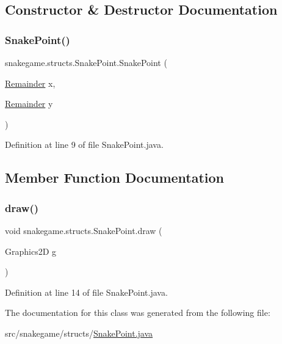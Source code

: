 \subsection{Constructor \& Destructor Documentation}
\mbox{\label{classsnakegame_1_1structs_1_1_snake_point_ae366301b429df98a08689c778a097d7c}} 
\subsubsection{\texorpdfstring{Snake\+Point()}{SnakePoint()}}
{\footnotesize\ttfamily snakegame.\+structs.\+Snake\+Point.\+Snake\+Point (\begin{DoxyParamCaption}\item[{\mbox{\hyperlink{classsnakegame_1_1structs_1_1_remainder}{Remainder}}}]{x,  }\item[{\mbox{\hyperlink{classsnakegame_1_1structs_1_1_remainder}{Remainder}}}]{y }\end{DoxyParamCaption})}



Definition at line 9 of file Snake\+Point.\+java.



\subsection{Member Function Documentation}
\mbox{\label{classsnakegame_1_1structs_1_1_snake_point_aa226b89f8a362d365d5f1d1b522aabaf}} 
\subsubsection{\texorpdfstring{draw()}{draw()}}
{\footnotesize\ttfamily void snakegame.\+structs.\+Snake\+Point.\+draw (\begin{DoxyParamCaption}\item[{Graphics2D}]{g }\end{DoxyParamCaption})}



Definition at line 14 of file Snake\+Point.\+java.



The documentation for this class was generated from the following file\+:\begin{DoxyCompactItemize}
\item 
src/snakegame/structs/\mbox{\hyperlink{_snake_point_8java}{Snake\+Point.\+java}}\end{DoxyCompactItemize}

